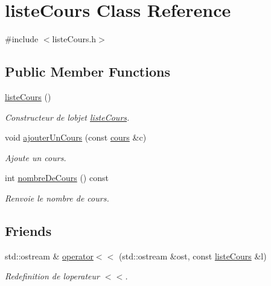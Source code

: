 \hypertarget{classliste_cours}{}\section{liste\+Cours Class Reference}
\label{classliste_cours}


{\ttfamily \#include $<$liste\+Cours.\+h$>$}

\subsection*{Public Member Functions}
\begin{DoxyCompactItemize}
\item 
\hyperlink{classliste_cours_af5a10a6e898373e43355b8a29dc20b83}{liste\+Cours} ()
\begin{DoxyCompactList}\small\item\em Constructeur de l\textquotesingle{}objet \hyperlink{classliste_cours}{liste\+Cours}. \end{DoxyCompactList}\item 
void \hyperlink{classliste_cours_aacc38305cfea76d8cc77d710d144ce8b}{ajouter\+Un\+Cours} (const \hyperlink{classcours}{cours} \&c)
\begin{DoxyCompactList}\small\item\em Ajoute un cours. \end{DoxyCompactList}\item 
int \hyperlink{classliste_cours_a34b859c2380770eb560c0a6dcf01cc81}{nombre\+De\+Cours} () const
\begin{DoxyCompactList}\small\item\em Renvoie le nombre de cours. \end{DoxyCompactList}\end{DoxyCompactItemize}
\subsection*{Friends}
\begin{DoxyCompactItemize}
\item 
std\+::ostream \& \hyperlink{classliste_cours_a78ee4cc125386ff5f709ea4ec9438f69}{operator$<$$<$} (std\+::ostream \&ost, const \hyperlink{classliste_cours}{liste\+Cours} \&l)
\begin{DoxyCompactList}\small\item\em Redefinition de l\textquotesingle{}operateur $<$$<$. \end{DoxyCompactList}\end{DoxyCompactItemize}


